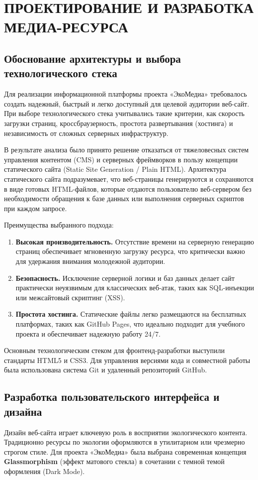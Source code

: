 \section{ПРОЕКТИРОВАНИЕ И РАЗРАБОТКА МЕДИА-РЕСУРСА}

\subsection{Обоснование архитектуры и выбора технологического стека}
Для реализации информационной платформы проекта «ЭкоМедиа» требовалось создать надежный, быстрый и легко доступный для целевой аудитории веб-сайт. При выборе технологического стека учитывались такие критерии, как скорость загрузки страниц, кроссбраузерность, простота развертывания (хостинга) и независимость от сложных серверных инфраструктур. 

В результате анализа было принято решение отказаться от тяжеловесных систем управления контентом (CMS) и серверных фреймворков в пользу концепции статического сайта (Static Site Generation / Plain HTML). Архитектура статического сайта подразумевает, что веб-страницы генерируются и сохраняются в виде готовых HTML-файлов, которые отдаются пользователю веб-сервером без необходимости обращения к базе данных или выполнения серверных скриптов при каждом запросе.

Преимущества выбранного подхода:
\begin{enumerate}
    \item \textbf{Высокая производительность.} Отсутствие времени на серверную генерацию страниц обеспечивает мгновенную загрузку ресурса, что критически важно для удержания внимания молодежной аудитории.
    \item \textbf{Безопасность.} Исключение серверной логики и баз данных делает сайт практически неуязвимым для классических веб-атак, таких как SQL-инъекции или межсайтовый скриптинг (XSS).
    \item \textbf{Простота хостинга.} Статические файлы легко размещаются на бесплатных платформах, таких как GitHub Pages, что идеально подходит для учебного проекта и обеспечивает надежную работу 24/7.
\end{enumerate}

Основным технологическим стеком для фронтенд-разработки выступили стандарты HTML5 и CSS3. Для управления версиями кода и совместной работы была использована система Git и удаленный репозиторий GitHub.

\subsection{Разработка пользовательского интерфейса и дизайна}
Дизайн веб-сайта играет ключевую роль в восприятии экологического контента. Традиционно ресурсы по экологии оформляются в утилитарном или чрезмерно строгом стиле. Для проекта «ЭкоМедиа» была выбрана современная концепция \textbf{Glassmorphism} (эффект матового стекла) в сочетании с темной темой оформления (Dark Mode).

